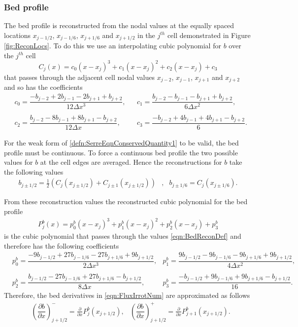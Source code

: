 \documentclass[times]{elsarticle}
\begin{document}
\subsubsection{Bed profile }
The bed profile is reconstructed from the nodal values at the equally spaced locations $x_{j-1/2}$, $x_{j-1/6}$, $x_{j+1/6}$ and $x_{j+1/2}$ in the $j^{th}$ cell demonstrated in Figure \ref{fig:ReconLocs}. To do this we use an interpolating cubic polynomial for $b$ over the $j^{th}$ cell
\begin{equation*}
C_j(x) = c_0 \left(x - x_j\right)^3 + c_1 \left(x - x_j\right)^2 + c_2 \left(x - x_j\right) + c_3
\label{eqn:cubicforbedrecon}
\end{equation*}
that passes through the adjacent cell nodal values $x_{j-2}$, $x_{j-1}$, $x_{j+1}$ and $x_{j+2}$ and so has the coefficients
\begin{align*}
&c_0 =  \dfrac{-b_{j-2} + 2b_{j-1} - 2 b_{j+1} + b_{j+2}}{12 \Delta x^3}, & &
c_1 =  \dfrac{b_{j-2} - b_{j-1} - b_{j+1} + b_{j+2}}{6 \Delta x^2},\\ \\
&c_2 =  \dfrac{b_{j-2} - 8b_{j-1} + 8 b_{j+1} - b_{j+2}}{12 \Delta x},& &
c_3 =  \dfrac{-b_{j-2}  + 4b_{j-1} + 4 b_{j+1} - b_{j+2}}{6}.
\end{align*}

For the weak form of \eqref{defn:SerreEqnConservedQuantity1} to be valid, the bed profile must be continuous. To force a continuous bed profile the two possible values for $b$ at the cell edges are averaged. Hence the reconstructions for $b$ take the following values
\begin{align}
\label{eqn:BedReconDef}
b_{j\pm1/2} =  \frac{1}{2}\left( C_j(x_{j\pm 1/2}) + C_{j\pm 1}(x_{j\pm 1/2})\right)&,& 	b_{j\pm 1/6} =  C_j(x_{j\pm 1/6}).
\end{align}

From these reconstruction values the reconstructed cubic polynomial for the bed profile
\begin{align*}
P^b_j(x) = p^b_0 (x - x_j)^3 + p^b_1(x-x_j)^2 + p^b_2(x- x_j) + p^b_3
\end{align*}
is the cubic polynomial that passes through the values \eqref{eqn:BedReconDef} and therefore has the following coefficients
\begin{align*}
&p^b_0 =  \dfrac{-9b_{j-1/2} + 27b_{j-1/6} - 27 b_{j+1/6} + 9b_{j+1/2}}{2 \Delta x^3},
&p^b_1 =  \dfrac{9b_{j-1/2} - 9b_{j-1/6} - 9b_{j+1/6} + 9b_{j+1/2}}{4 \Delta x^2},\\ \\
&p^b_2 =  \dfrac{b_{j-1/2} - 27b_{j-1/6} + 27 b_{j+1/6} - b_{j+1/2}}{8 \Delta x},
&p^b_3 =  \dfrac{-b_{j-1/2}  + 9b_{j-1/6} + 9 b_{j+1/6} - b_{j+1/2}}{16}.
\end{align*}
Therefore, the bed derivatives in \eqref{eqn:FluxIrrotNum} are approximated as follows
\begin{align}
\label{eqn:PolyDerivb}
&\left(\dfrac{\partial {b}}{\partial x} \right)^-_{j + 1/2} = \frac{\partial }{\partial x}P^b_j(x_{j+1/2}),
&\left(\dfrac{\partial {b}}{\partial x} \right)^+_{j + 1/2} = \frac{\partial }{\partial x}P^b_{j+1}(x_{j+1/2}).
\end{align}
\end{document}
